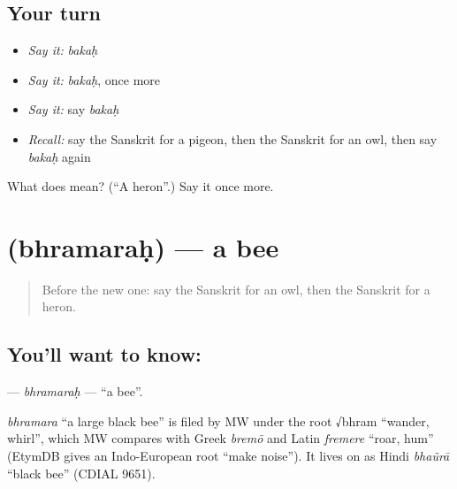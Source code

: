 \subsection*{Your turn}
\begin{itemize}
\raggedright
  \item \emph{Say it:} \emph{bakaḥ}
  \item \emph{Say it:} \emph{bakaḥ}, once more
  \item \emph{Say it:} say \emph{bakaḥ}
  \item \emph{Recall:} say the Sanskrit for a pigeon, then the Sanskrit for an owl, then say \emph{bakaḥ} again
\end{itemize}

\begin{tcolorbox}[breakable,colback=teal!4,colframe=teal!35!black,title={Before you move on}]
What does  mean? (\textquotedblleft{}A heron\textquotedblright{}.) Say it once more.
\end{tcolorbox}
\section[\texorpdfstring{\sk{भ्रमरः} (bhramaraḥ)}{भ्रमरः (bhramaraḥ)}]{ (bhramaraḥ) — a bee}

\label{lesson:SA-C114-bhramarah}



\begin{quote}
Before the new one: say the Sanskrit for an owl, then the Sanskrit for a heron.
\end{quote}

\subsection*{You'll want to know: }
\textbf{} — \emph{bhramaraḥ} — \textquotedblleft{}a bee\textquotedblright{}.

\begin{cousinweb}
\emph{bhramara} \textquotedblleft{}a large black bee\textquotedblright{} is filed by MW under the root √bhram \textquotedblleft{}wander, whirl\textquotedblright{}, which MW compares with Greek \emph{bremō} and Latin \emph{fremere} \textquotedblleft{}roar, hum\textquotedblright{} (EtymDB gives an Indo-European root \textquotedblleft{}make noise\textquotedblright{}). It lives on as Hindi \emph{bhaũrā} \textquotedblleft{}black bee\textquotedblright{} (CDIAL 9651).
\end{cousinweb}

